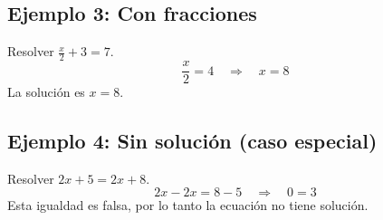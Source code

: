\documentclass{article}
\begin{document}
\bigskip
{}
\subsection*{Ejemplo 3: Con fracciones}
\vspace{0.4cm}
Resolver \(\frac{x}{2} + 3 = 7\).
\vspace{0.6cm}
{\large \[ \frac{x}{2} = 4 \quad \Rightarrow \quad x = 8 \] }
\vspace{0.6cm}
La solución es \(x = 8\).

\bigskip
{}
\subsection*{Ejemplo 4: Sin solución (caso especial)}
\vspace{0.4cm}
Resolver \(2x + 5 = 2x + 8\).
\vspace{0.6cm}
{\large \[ 2x - 2x = 8 - 5 \quad \Rightarrow \quad 0 = 3 \] }
\vspace{0.6cm}
Esta igualdad es falsa, por lo tanto la ecuación no tiene solución.
\end{document}
